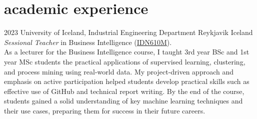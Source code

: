 \documentclass[]{cv} %
\begin{document}
\section{academic experience}
\begin{entrylist}
    \entry
	{2023}
	{University of Iceland, Industrial Engineering Department}
	{Reykjavik Iceland}
	{\emph{Sessional Teacher} in Business Intelligence (\href{https://ugla.hi.is/kennsluskra/index.php?tab=nam&chapter=namskeid&id=71001420230}{IDN610M}). \\
As a lecturer for the Business Intelligence course, I taught 3rd year BSc and 1st year MSc students the practical applications of supervised learning, clustering, and process mining using real-world data. My project-driven approach and emphasis on active participation helped students develop practical skills such as effective use of GitHub and technical report writing. By the end of the course, students gained a solid understanding of key machine learning techniques and their use cases, preparing them for success in their future careers.
	}
\end{entrylist}
\end{document}
